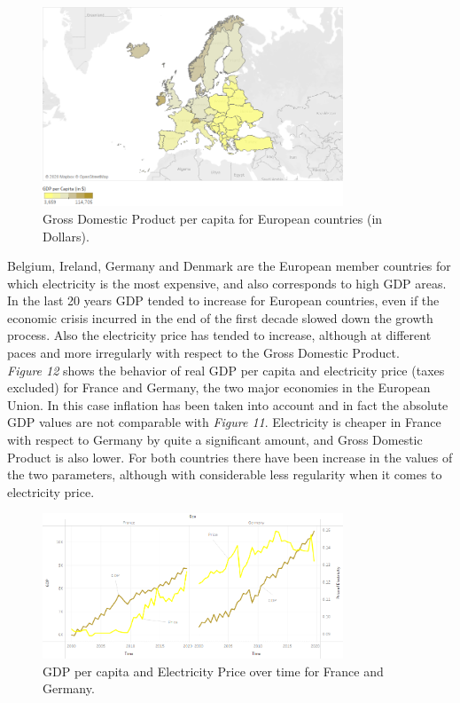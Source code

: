 \documentclass{book}
\begin{document}
\bigskip
\begin{figure}[H]
\begin{center}
\captionsetup{justification=centering}
\includegraphics[width=0.8\textwidth]{Images/gdp.png}
\caption{Gross Domestic Product per capita for European countries (in Dollars). }
\end{center}
\end{figure}
\bigskip

Belgium, Ireland, Germany and Denmark are the European member countries for which electricity is the most expensive, and also corresponds to high GDP areas. In the last 20 years GDP tended to increase for European countries, even if the economic crisis incurred in the end of the first decade slowed down the growth process. Also the electricity price has tended to increase, although at different paces and more irregularly with respect to the Gross Domestic Product.\\

\textit{Figure 12} shows the behavior of real GDP per capita and electricity price (taxes excluded) for France and Germany, the two major economies in the European Union.  In this case inflation has been taken into account and in fact the absolute GDP values are not comparable with \textit{Figure 11}. Electricity is cheaper in France with respect to Germany by quite a significant amount, and Gross Domestic Product is also lower. For both countries there have been increase in the values of the two parameters, although with considerable less regularity when it comes to electricity price.

\bigskip
\begin{figure}[H]
\begin{center}
\captionsetup{justification=centering}
\includegraphics[width=0.8\textwidth]{Images/pri-gdp.png}
\caption{GDP per capita and Electricity Price over time for France and Germany. }
\end{center}
\end{figure}
\bigskip
\end{document}

